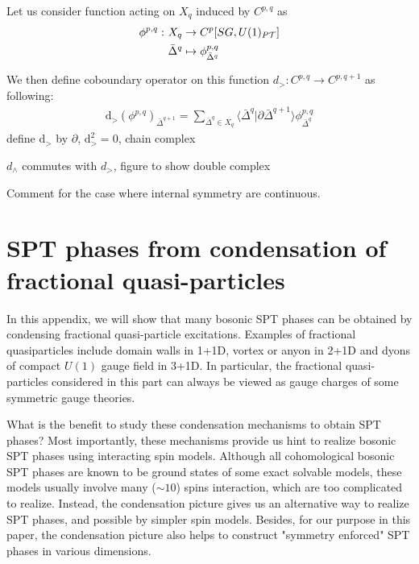 \documentclass[%
 reprint,
 amsmath,amssymb,
 aps,pra,
]{revtex4-1}
\newcommand{\dd}{\mathrm{d}} %
\newcommand{\TT}{\mathcal{T}} %
\newcommand{\bDelta}{\bar{\Delta}}
\begin{document}
\begin{enumerate}
    Let us consider function acting on $X_q$ induced by $C^{p,q}$ as
    \begin{align}
      \phi^{p,q}:~& X_q\rightarrow C^p[SG,U(1)_{P\TT}]\notag\\
      &\bar{\Delta}^q\mapsto\phi^{p,q}_{\bar{\Delta}^q}
      \label{}
    \end{align}
    
    We then define coboundary operator on this function $d_>:C^{p,q}\rightarrow C^{p,q+1}$ as following:
    \begin{align}
      \dd_>\left(\phi^{p,q}\right)_{\bar{\Delta}^{q+1}}=\sum_{\bDelta^{q}\in X_{q}}\langle\bDelta^q|\partial\bDelta^{q+1}\rangle \phi^{p,q}_{\bDelta^{q}}
    \end{align}
    {\color{red} define $\dd_>$ by $\partial$, $\dd_>^2=0$, chain complex}
\end{enumerate}

{\color{red} $d_\wedge$ commutes with $d_>$, figure to show double complex}


{\color{red} Comment for the case where internal symmetry are continuous.}

\section{SPT phases from condensation of fractional quasi-particles}\label{app:SPT_condensation}
In this appendix, we will show that many bosonic SPT phases can be obtained by condensing fractional quasi-particle excitations.
Examples of fractional quasiparticles include domain walls in 1+1D, vortex or anyon in 2+1D and dyons of compact $U(1)$ gauge field in 3+1D.
In particular, the fractional quasi-particles considered in this part can always be viewed as gauge charges of some symmetric gauge theories.

What is the benefit to study these condensation mechanisms to obtain SPT phases?
Most importantly, these mechanisms provide us hint to realize bosonic SPT phases using interacting spin models.
Although all cohomological bosonic SPT phases are known to be ground states of some exact solvable models, these models usually involve many ($\sim 10$) spins interaction, which are too complicated to realize.
Instead, the condensation picture gives us an alternative way to realize SPT phases, and possible by simpler spin models.
Besides, for our purpose in this paper, the condensation picture also helps to construct "symmetry enforced" SPT phases in various dimensions.
\end{document}

